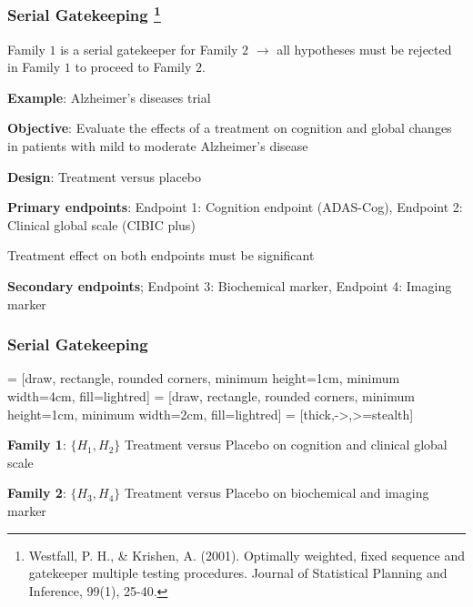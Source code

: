 \documentclass[xcolor={pdftex,dvipsnames,table}]{beamer}
\newcommand{\rbf}[1]{\textcolor{redUnipd}{ #1}}
\begin{document}
\begin{frame}
\frametitle{Serial Gatekeeping \footnote{Westfall, P. H., & Krishen, A. (2001). Optimally weighted, fixed sequence and gatekeeper multiple testing procedures. Journal of Statistical Planning and Inference, 99(1), 25-40.}}

Family $1$ is a \rbf{serial gatekeeper} for Family $2$ $\rightarrow$ all hypotheses must be rejected in Family $1$ to proceed to Family $2$.

\bigskip
\rbf{\textbf{Example}}: Alzheimer's diseases trial

\textbf{Objective}: Evaluate the effects of a treatment on cognition
and global changes in patients with mild to moderate Alzheimer's disease

\textbf{Design}: Treatment versus placebo

\textbf{Primary endpoints}: Endpoint 1: Cognition endpoint (ADAS-Cog), Endpoint 2: Clinical global scale (CIBIC plus)

Treatment effect on both endpoints must be significant

\textbf{Secondary endpoints}; Endpoint 3: Biochemical marker, Endpoint 4: Imaging marker
\end{frame}

\begin{frame}
\frametitle{Serial Gatekeeping}
 = [draw, rectangle, rounded corners, minimum height=1cm, minimum width=4cm, fill=lightred]
 = [draw, rectangle, rounded corners, minimum height=1cm, minimum width=2cm, fill=lightred]
 = [thick,->,>=stealth]

\begin{figure}
\centering

\end{figure}
\textbf{Family 1}: $\{H_1, H_2\}$  Treatment versus Placebo on cognition and clinical global scale

\textbf{Family 2}: $\{H_3, H_4\}$  Treatment versus Placebo on biochemical and imaging marker
\end{frame}
\end{document}

